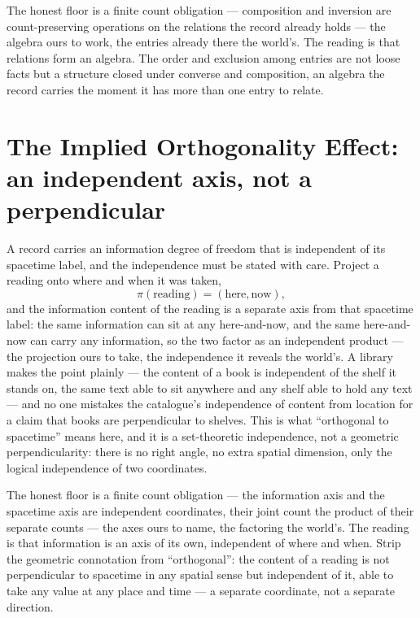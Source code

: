 The honest floor is a finite count obligation --- composition and inversion are count-preserving operations on
the relations the record already holds --- the algebra ours to work, the entries already there the world's.
The reading is that relations form an algebra. The order and exclusion
among entries are not loose facts but a structure closed under converse and composition, an algebra the record
carries the moment it has more than one entry to relate.

\section{The Implied Orthogonality Effect: an independent axis, not a perpendicular}
\label{se:implied-orthogonality}

A record carries an information degree of freedom that is independent of its spacetime label, and the
independence must be stated with care. Project a reading onto where and when it was taken,
\begin{equation}
  \pi(\text{reading}) = (\text{here}, \text{now}),
\end{equation}
and the information content of the reading is a separate axis from that spacetime label: the same information
can sit at any here-and-now, and the same here-and-now can carry any information, so the two factor as an
independent product --- the projection ours to take, the independence it reveals the world's. A library makes the point plainly --- the content of a book is independent of the shelf it
stands on, the same text able to sit anywhere and any shelf able to hold any text --- and no one mistakes the
catalogue's independence of content from location for a claim that books are perpendicular to shelves. This is
what ``orthogonal to spacetime'' means here, and it is a set-theoretic independence, not a geometric
perpendicularity: there is no right angle, no extra spatial dimension, only the logical independence of two
coordinates.

The honest floor is a finite count obligation --- the information axis and the spacetime axis are independent
coordinates, their joint count the product of their separate counts --- the axes ours to name, the factoring
the world's. The reading is that information is an axis
of its own, independent of where and when. Strip the geometric connotation from ``orthogonal'': the content of
a reading is not perpendicular to spacetime in any spatial sense but independent of it, able to take any value
at any place and time --- a separate coordinate, not a separate direction.

